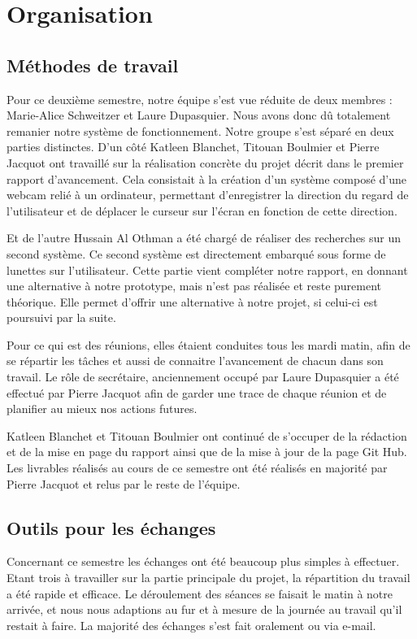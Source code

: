 \chapter{Organisation}

\section{Méthodes de travail}

Pour ce deuxième semestre, notre équipe s’est vue réduite de deux membres : Marie-Alice Schweitzer et Laure Dupasquier. Nous avons donc dû totalement remanier notre système de fonctionnement.
Notre groupe s'est séparé en deux parties distinctes. D’un côté Katleen Blanchet, Titouan Boulmier et Pierre Jacquot ont travaillé sur la réalisation concrète du projet décrit dans le premier rapport d’avancement. Cela consistait à la création d’un système composé d’une webcam relié à un ordinateur, permettant d’enregistrer la direction du regard de l’utilisateur et de déplacer le curseur sur l’écran en fonction de cette direction.

Et de l’autre Hussain Al Othman a été chargé de réaliser des recherches sur un second système. Ce second système est directement embarqué sous forme de lunettes sur l’utilisateur. Cette partie vient compléter notre rapport, en donnant une alternative à notre prototype, mais n'est pas réalisée et reste purement théorique. Elle permet d’offrir une alternative à notre projet, si celui-ci est poursuivi par la suite.

Pour ce qui est des réunions, elles étaient conduites tous les mardi matin, afin de se répartir les tâches et aussi de connaitre l’avancement de chacun dans son travail. Le rôle de secrétaire, anciennement occupé par Laure Dupasquier a été effectué par Pierre Jacquot afin de garder une trace de chaque réunion et de planifier au mieux nos actions futures.

Katleen Blanchet et Titouan Boulmier ont continué de s’occuper de la rédaction et de la mise en page du rapport ainsi que de la mise à jour de la page Git Hub.
Les livrables réalisés au cours de ce semestre ont été réalisés en majorité par Pierre Jacquot et relus par le reste de l’équipe.

\section{Outils pour les échanges}

Concernant ce semestre les échanges ont été beaucoup plus simples à effectuer. Etant trois à travailler sur la partie principale du projet, la répartition du travail a été rapide et efficace. Le déroulement des séances se faisait le matin à notre arrivée, et nous nous adaptions au fur et à mesure de la journée au travail qu’il restait à faire.
La majorité des échanges s'est fait oralement ou via e-mail.
 
